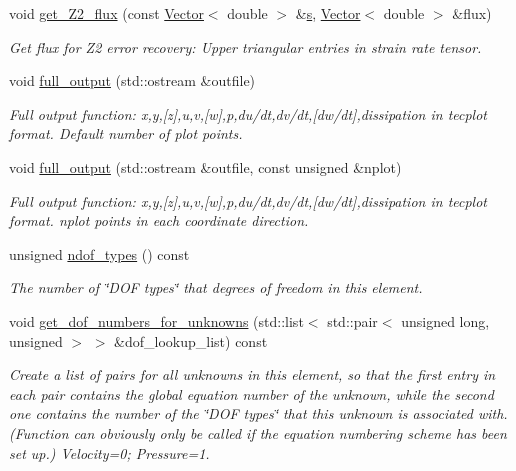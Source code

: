 \begin{DoxyCompactItemize}
void \hyperlink{classoomph_1_1GeneralisedNewtonianTCrouzeixRaviartElement_af41b2ba4e62e9025ca751e79ee570901}{get\+\_\+\+Z2\+\_\+flux} (const \hyperlink{classoomph_1_1Vector}{Vector}$<$ double $>$ \&\hyperlink{cfortran_8h_ab7123126e4885ef647dd9c6e3807a21c}{s}, \hyperlink{classoomph_1_1Vector}{Vector}$<$ double $>$ \&flux)
\begin{DoxyCompactList}\small\item\em Get \textquotesingle{}flux\textquotesingle{} for Z2 error recovery\+: Upper triangular entries in strain rate tensor. \end{DoxyCompactList}\item 
void \hyperlink{classoomph_1_1GeneralisedNewtonianTCrouzeixRaviartElement_abaec416cf3cfb7886e69df9e16aa18ff}{full\+\_\+output} (std\+::ostream \&outfile)
\begin{DoxyCompactList}\small\item\em Full output function\+: x,y,\mbox{[}z\mbox{]},u,v,\mbox{[}w\mbox{]},p,du/dt,dv/dt,\mbox{[}dw/dt\mbox{]},dissipation in tecplot format. Default number of plot points. \end{DoxyCompactList}\item 
void \hyperlink{classoomph_1_1GeneralisedNewtonianTCrouzeixRaviartElement_a9a56e552d21c152d7f39f543834a1eb7}{full\+\_\+output} (std\+::ostream \&outfile, const unsigned \&nplot)
\begin{DoxyCompactList}\small\item\em Full output function\+: x,y,\mbox{[}z\mbox{]},u,v,\mbox{[}w\mbox{]},p,du/dt,dv/dt,\mbox{[}dw/dt\mbox{]},dissipation in tecplot format. nplot points in each coordinate direction. \end{DoxyCompactList}\item 
unsigned \hyperlink{classoomph_1_1GeneralisedNewtonianTCrouzeixRaviartElement_a9c235f3983f798316a76bb0a40757f56}{ndof\+\_\+types} () const
\begin{DoxyCompactList}\small\item\em The number of \char`\"{}\+D\+O\+F types\char`\"{} that degrees of freedom in this element. \end{DoxyCompactList}\item 
void \hyperlink{classoomph_1_1GeneralisedNewtonianTCrouzeixRaviartElement_a3ee7761ed0d48a2aa0b2b6a7f0dd409d}{get\+\_\+dof\+\_\+numbers\+\_\+for\+\_\+unknowns} (std\+::list$<$ std\+::pair$<$ unsigned long, unsigned $>$ $>$ \&dof\+\_\+lookup\+\_\+list) const
\begin{DoxyCompactList}\small\item\em Create a list of pairs for all unknowns in this element, so that the first entry in each pair contains the global equation number of the unknown, while the second one contains the number of the \char`\"{}\+D\+O\+F types\char`\"{} that this unknown is associated with. (Function can obviously only be called if the equation numbering scheme has been set up.) Velocity=0; Pressure=1. \end{DoxyCompactList}\item 

\end{DoxyCompactItemize}
